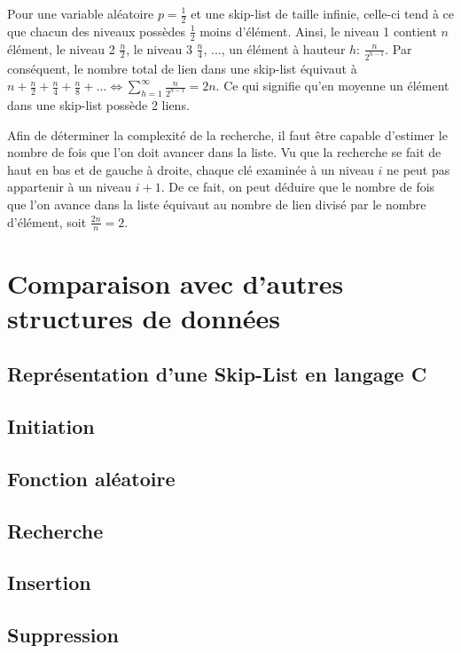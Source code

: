 \documentclass[hidelinks,a4paper, 12pt]{article}
\begin{document}
	
	Pour une variable aléatoire $p=\frac{1}{2}$ et une skip-list de taille infinie, celle-ci tend à ce que chacun des niveaux possèdes $\frac{1}{2}$ moins d'élément. Ainsi, le niveau 1 contient $n$ élément, le niveau 2 $\frac{n}{2}$, le niveau 3 $\frac{n}{4}$, ..., un élément à hauteur $h$: $\frac{n}{{2}^{h-1}}$. Par conséquent, le nombre total de lien dans une skip-list équivaut à $n+\frac{n}{2}+\frac{n}{4}+\frac{n}{8}+\dots \iff \sum_{h=1}^{\infty}\frac{n}{{2}^{h-1}} = 2n$. Ce qui signifie qu'en moyenne un élément dans une skip-list possède 2 liens.
	
	Afin de déterminer la complexité de la recherche, il faut être capable d'estimer le nombre de fois que l'on doit avancer dans la liste. Vu que la recherche se fait de haut en bas et de gauche à droite, chaque clé examinée à un niveau $i$ ne peut pas appartenir à un niveau $i+1$. 
	De ce fait, on peut déduire que le nombre de fois que l'on avance dans la liste équivaut au nombre de lien divisé par le nombre d'élément, soit $\frac{2n}{n}=2$.
	
	
	\section{Comparaison avec d'autres structures de données}
	
	
	\begin{appendices}
	\newpage
	\section{Représentation d'une Skip-List en langage C}
	\subsection{Initiation}\label{SKInit}
	
	\subsection{Fonction aléatoire}\label{SKRandom}
	

	\subsection{Recherche}\label{SKSearch}
	

	\subsection{Insertion}\label{SKInsert}
	
	
	\subsection{Suppression}\label{SKDelete}
	
	\newpage
	\end{appendices}
	
\end{document}

